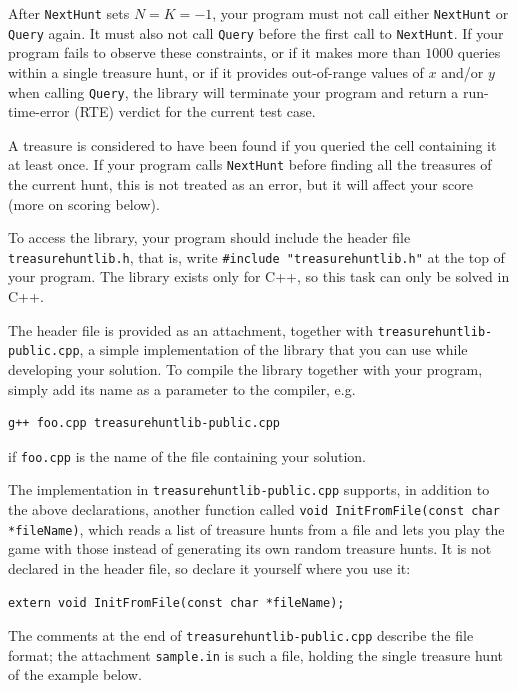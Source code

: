 After \texttt{NextHunt} sets $N = K = -1$, your program must not call either
\texttt{NextHunt} or \texttt{Query} again. It must also not call \texttt{Query}
before the first call to \texttt{NextHunt}. If your program fails to observe
these constraints, or if it makes more than $1000$ queries within a single
treasure hunt, or if it provides out-of-range values of $x$ and/or $y$ when
calling \texttt{Query}, the library will terminate your program and return a
run-time-error (RTE) verdict for the current test case.

A treasure is considered to have been found if you queried the cell containing it
at least once. If your program calls \texttt{NextHunt} before finding all the
treasures of the current hunt, this is not treated as an error, but it will affect
your score (more on scoring below).

To access the library, your program should include the header file
\texttt{treasurehuntlib.h}, that is, write \texttt{\#include "treasurehuntlib.h"}
at the top of your program. The library exists only for C++, so this task can only
be solved in C++.

The header file is provided as an attachment, together with
\texttt{treasurehuntlib-public.cpp}, a simple implementation of the library that
you can use while developing your solution. To compile the library together with
your program, simply add its name as a parameter to the compiler, e.g.

\begin{verbatim}
g++ foo.cpp treasurehuntlib-public.cpp
\end{verbatim}

if \texttt{foo.cpp} is the name of the file containing your solution.

The implementation in \texttt{treasurehuntlib-public.cpp} supports, in addition to
the above declarations, another function called
\texttt{void InitFromFile(const char *fileName)}, which reads a list of treasure
hunts from a file and lets you play the game with those instead of generating its
own random treasure hunts. It is not declared in the header file, so declare it
yourself where you use it:

\begin{verbatim}
extern void InitFromFile(const char *fileName);
\end{verbatim}

The comments at the end of \texttt{treasurehuntlib-public.cpp} describe the file
format; the attachment \texttt{sample.in} is such a file, holding the single
treasure hunt of the example below.

